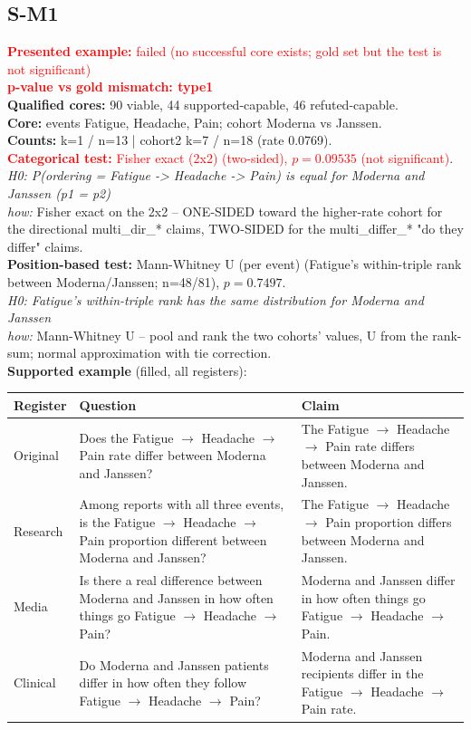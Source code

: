 \documentclass[11pt]{article}
\begin{document}
\subsection*{S-M1}
\textcolor{red}{\textbf{Presented example:} failed (no successful core exists; gold set but the test is not significant)} \\
\textcolor{red}{\textbf{p-value vs gold mismatch: type1}} \\
\textbf{Qualified cores:} 90 viable, 44 supported-capable, 46 refuted-capable. \\
\textbf{Core:} events Fatigue, Headache, Pain; cohort Moderna vs Janssen. \\
\textbf{Counts:} k=1 / n=13  |  cohort2 k=7 / n=18  (rate 0.0769). \\
\textcolor{red}{\textbf{Categorical test:} Fisher exact (2x2) (two-sided), $p = 0.09535$ (not significant)}. \\
\emph{H0: P(ordering = Fatigue -> Headache -> Pain) is equal for Moderna and Janssen (p1 = p2)} \\
\emph{how:} Fisher exact on the 2x2 -- ONE-SIDED toward the higher-rate cohort for the directional multi\_dir\_* claims, TWO-SIDED for the multi\_differ\_* "do they differ" claims. \\
\textbf{Position-based test:} Mann-Whitney U (per event) (Fatigue's within-triple rank between Moderna/Janssen; n=48/81), $p = 0.7497$. \\
\emph{H0: Fatigue's within-triple rank has the same distribution for Moderna and Janssen} \\
\emph{how:} Mann-Whitney U -- pool and rank the two cohorts' values, U from the rank-sum; normal approximation with tie correction. \\
\textbf{Supported example} (filled, all registers): \\
\begin{tabularx}{\linewidth}{@{}l L L@{}}
\toprule
\textbf{Register} & \textbf{Question} & \textbf{Claim} \\
\midrule
Original & Does the Fatigue $\rightarrow$  Headache $\rightarrow$  Pain rate differ between Moderna and Janssen? & The Fatigue $\rightarrow$  Headache $\rightarrow$  Pain rate differs between Moderna and Janssen. \\
Research & Among reports with all three events, is the Fatigue $\rightarrow$  Headache $\rightarrow$  Pain proportion different between Moderna and Janssen? & The Fatigue $\rightarrow$  Headache $\rightarrow$  Pain proportion differs between Moderna and Janssen. \\
Media & Is there a real difference between Moderna and Janssen in how often things go Fatigue $\rightarrow$  Headache $\rightarrow$  Pain? & Moderna and Janssen differ in how often things go Fatigue $\rightarrow$  Headache $\rightarrow$  Pain. \\
Clinical & Do Moderna and Janssen patients differ in how often they follow Fatigue $\rightarrow$  Headache $\rightarrow$  Pain? & Moderna and Janssen recipients differ in the Fatigue $\rightarrow$  Headache $\rightarrow$  Pain rate. \\
\bottomrule
\end{tabularx}
\vspace{3pt}
\end{document}
